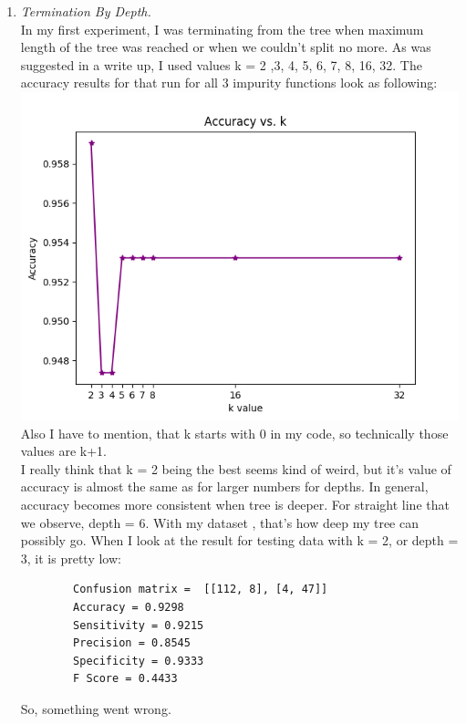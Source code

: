 \documentclass[12pt, letterpaper]{article}
\begin{document}
\begin{enumerate}[label=\Roman*.]
\begin{enumerate}[label=\arabic*.]
		\item {\it Termination By Depth. }\\
		
		In my first experiment, I was terminating from the tree when maximum length of the tree was reached or when we couldn't split no more. As was suggested in a write up, I used values k = 2 ,3, 4, 5, 6, 7, 8, 16, 32. The accuracy results for that run for all 3 impurity functions look as following:\\
		\includegraphics[scale=0.7]{../images/accuracy_validation_DT_Depth_error_0.png} \\ 
		
		Also I have to mention, that k starts with 0 in my code, so technically those values are k+1. \\
		I really think that k = 2 being the best seems kind of weird, but it's value of accuracy is almost the same as for larger numbers for depths. In general, accuracy becomes more consistent when tree is deeper. For straight line that we observe, depth = 6. With my dataset , that's how deep my tree can possibly go. When I look at the result for testing data with k = 2, or depth = 3, it is pretty low: \\
		\begin{verbatim}		
		Confusion matrix =  [[112, 8], [4, 47]] 
		Accuracy = 0.9298
		Sensitivity = 0.9215
		Precision = 0.8545
		Specificity = 0.9333 
		F Score = 0.4433
		\end{verbatim}
		
		So, something went wrong. \\
		

\end{enumerate}
\end{enumerate}
\end{document}
